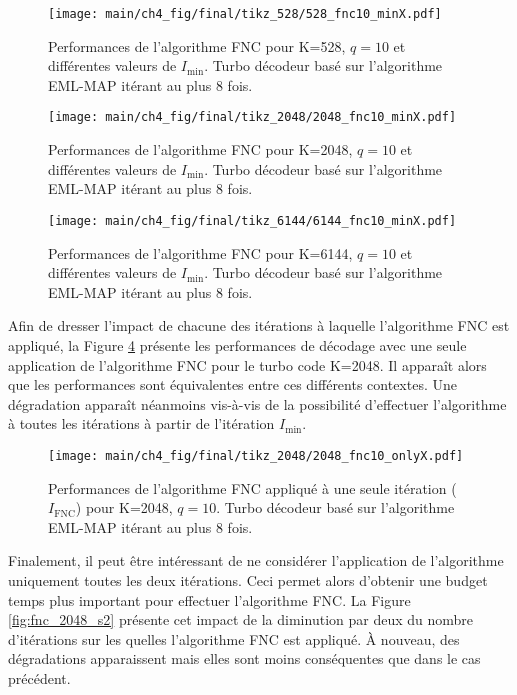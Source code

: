 \begin{figure}[!h]
	\centering
	\texttt{[image: main/ch4\_fig/final/tikz\_528/528\_fnc10\_minX.pdf]}
	\caption{Performances de l'algorithme FNC pour K=528, $q=10$ et différentes valeurs de $I_\text{min}$. 
	Turbo décodeur basé sur l'algorithme EML-MAP itérant au plus 8 fois.
	\label{fig:fnc_min_528}}
\end{figure}

\begin{figure}[!h]
	\centering
	\texttt{[image: main/ch4\_fig/final/tikz\_2048/2048\_fnc10\_minX.pdf]}
	\caption{Performances de l'algorithme FNC pour K=2048, $q=10$ et différentes valeurs de $I_\text{min}$. 
	Turbo décodeur basé sur l'algorithme EML-MAP itérant au plus 8 fois.
	\label{fig:fnc_min_2048}}
\end{figure}

\begin{figure}[!h]
	\centering 
	\texttt{[image: main/ch4\_fig/final/tikz\_6144/6144\_fnc10\_minX.pdf]}
	\caption{Performances de l'algorithme FNC pour K=6144, $q=10$ et différentes valeurs de $I_\text{min}$. 
	Turbo décodeur basé sur l'algorithme EML-MAP itérant au plus 8 fois.
	\label{fig:fnc_min_6144}}
\end{figure}

Afin de dresser l'impact de chacune des itérations à laquelle l’algorithme FNC est appliqué, la Figure 
\ref{fig:fnc_only_2048} présente les performances de décodage avec une seule application de l'algorithme FNC pour le 
turbo code K=2048. Il apparaît alors que les performances sont équivalentes entre ces différents contextes. 
Une dégradation apparaît néanmoins vis-à-vis de la possibilité d'effectuer l'algorithme à toutes les itérations à partir
de l'itération $I_\text{min}$.

\begin{figure}[!h]
	\centering
	\texttt{[image: main/ch4\_fig/final/tikz\_2048/2048\_fnc10\_onlyX.pdf]}
	\caption{Performances de l'algorithme FNC appliqué à une seule itération ($I_\text{FNC}$) pour K=2048, $q=10$.
	Turbo décodeur basé sur l'algorithme EML-MAP itérant au plus 8 fois.
	\label{fig:fnc_only_2048}}
\end{figure}

Finalement, il peut être intéressant de ne considérer l'application de l'algorithme uniquement toutes les deux 
itérations. Ceci permet alors d'obtenir une budget temps plus important pour effectuer l'algorithme FNC. La Figure 
\ref{fig:fnc_2048_s2} présente cet impact de la diminution par deux du nombre d'itérations sur les quelles l'algorithme FNC
est appliqué. À nouveau, des dégradations apparaissent mais elles sont moins conséquentes que dans le cas précédent.

